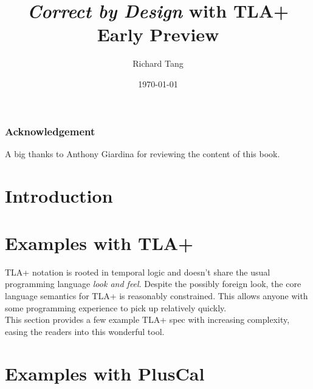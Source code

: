 \documentclass{kdp}
\title{\textit{Correct by Design} with TLA+ \\ Early Preview}
\author{Richard Tang}
\date{\today}
\begin{document}
\maketitle


\section*{Acknowledgement}

A big thanks to Anthony Giardina for reviewing the content of this book.

\tableofcontents

\part{Introduction}





\part{Examples with TLA+}

TLA+ notation is rooted in temporal logic and doesn't share the usual
programming language \textit{look and feel}. Despite the possibly foreign look,
the core language semantics for TLA+ is reasonably constrained. This allows
anyone with some programming experience to pick up relatively quickly. \\

This section provides a few example TLA+ spec with increasing complexity, easing
the readers into this wonderful tool.

% 















\part{Examples with PlusCal}
\end{document}

